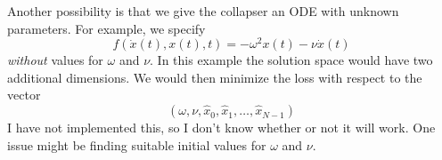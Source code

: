 \documentclass{article}
\begin{document}
Another possibility is that we give the collapser an ODE with unknown parameters.
For example, we specify
$$
f(\dot{x}(t), x(t), t) = -\omega^2 x(t) - \nu \dot{x}(t)
$$
\emph{without} values for $\omega$ and $\nu$.
In this example the solution space would have two additional dimensions.
We would then minimize the loss with respect to the vector
$$
\left(\omega, \nu, \hat{x}_0, \hat{x}_1, \dots, \hat{x}_{N-1} \right)
$$
I have not implemented this, so I don't know whether or not it will work.
One issue might be finding suitable initial values for $\omega$ and $\nu$.



\end{document}
